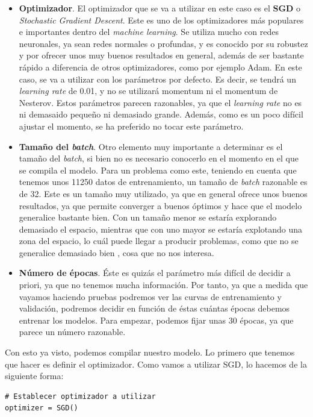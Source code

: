 \documentclass[11pt,a4paper]{article}
\begin{document}
\begin{itemize}
	\item \textbf{Optimizador}. El optimizador que se va a utilizar en este caso es el \textbf{SGD} o \textit{Stochastic
	Gradient Descent}. 	Este es uno de los optimizadores más populares e importantes dentro del \textit{machine learning}.
	Se utiliza mucho con redes neuronales, ya sean redes normales o profundas, y es conocido por su robustez y por ofrecer
	unos muy buenos resultados	en general, además de ser bastante rápido a diferencia de otros optimizadores, como por ejemplo
	Adam. En este caso, se va a utilizar con los parámetros por defecto. Es decir, se tendrá un \textit{learning rate} de 0.01,
	y no se utilizará momentum ni el momentum de Nesterov. Estos parámetros parecen razonables, ya que el \textit{learning
	rate} no es ni demasaido pequeño ni demasiado grande. Además, como es un poco difícil ajustar el momento, se ha preferido
	no tocar este parámetro.
	\item \textbf{Tamaño del \textit{batch}}. Otro elemento muy importante a determinar es el tamaño del \textit{batch}, si bien
	no es necesario conocerlo en el momento en el que se compila el modelo. Para un problema como este, teniendo en cuenta que
	tenemos unos 11250 datos de entrenamiento, un tamaño de \textit{batch} razonable es de 32. Este es un tamaño muy utilizado,
	ya que en general ofrece unos buenos resultados, ya que permite converger a buenos óptimos y hace que el modelo
	generalice bastante bien. Con un tamaño menor se estaría explorando demasiado el espacio, mientras que con uno mayor se
	estaría explotando una zona del espacio, lo cuál puede llegar a producir problemas, como que no se generalice demasiado
	bien \cite{DBLP:journals/corr/KeskarMNST16}, cosa que no nos interesa.
	\item \textbf{Número de épocas}. Éste es quizás el parámetro más difícil de decidir a priori, ya que no tenemos mucha
	información. Por tanto, ya que a medida que vayamos haciendo pruebas podremos ver las curvas de entrenamiento y validación,
	podremos decidir en función de éstas cuántas épocas debemos entrenar los modelos. Para empezar, podemos fijar unas 30 épocas,
	ya que parece un número razonable.
\end{itemize}

Con esto ya visto, podemos compilar nuestro modelo. Lo primero que tenemos que hacer es definir el optimizador. Como vamos
a utilizar SGD, lo hacemos de la siguiente forma:

\begin{lstlisting}
# Establecer optimizador a utilizar
optimizer = SGD()
\end{lstlisting}
\end{document}
